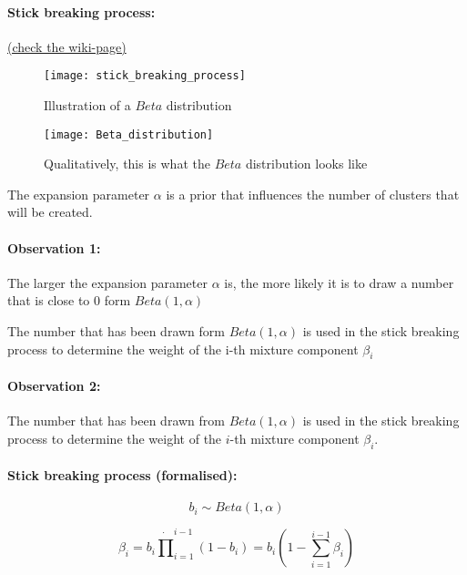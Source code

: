 \paragraph{Stick breaking process:} \href{https://en.wikipedia.org/wiki/Dirichlet_process#The_stick-breaking_process}{(check the wiki-page)}
\begin{figure}[H]
  \centering
  \begin{minipage}[b]{0.49\textwidth}
    \texttt{[image: stick\_breaking\_process]}
    \caption{Illustration of a $Beta$ distribution}
  \end{minipage}
  \begin{minipage}[b]{0.49\textwidth}
    \texttt{[image: Beta\_distribution]}
    \caption{Qualitatively, this is what the $Beta$ distribution looks like}
    \label{mean-shift-issue}
  \end{minipage}
\end{figure}

The expansion parameter $\alpha$ is a prior that influences the number of clusters that will be created.

\paragraph{Observation 1:}
The larger the expansion parameter $\alpha$ is, the more likely it is to draw a number that is close to $0$ form $Beta(1,\alpha)$

The number that has been drawn form $Beta(1,\alpha)$ is used in the stick breaking process to determine the weight of the i-th mixture component $\beta_i$

\paragraph{Observation 2:}
The number that has been drawn from \(Beta(1,\alpha)\) is used in the stick breaking process to determine the weight of the \(i\)-th mixture component \(\beta_i\).

\paragraph{Stick breaking process (formalised):}

\begin{equation*}
	b_i \sim Beta(1,\alpha)
\end{equation*}

\begin{equation*}
	\beta_i = b_i \dot \prod_{i=1}^{i-1}(1-b_i) = b_i (1 - \sum_{i=1}^{i-1} \beta_i)
\end{equation*}

